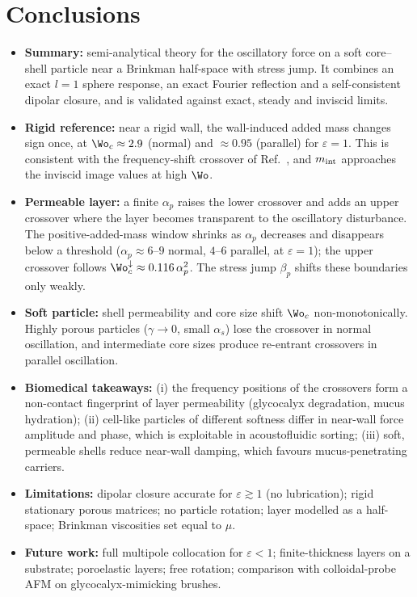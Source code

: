 \section{Conclusions}\label{sec:conclusion}
\begin{itemize}
  \item \textbf{Summary:} semi-analytical theory for the oscillatory force on a soft core--shell particle near a
        Brinkman half-space with stress jump. It combines an exact $l=1$ sphere response, an exact Fourier reflection and a
        self-consistent dipolar closure, and is validated against exact, steady and inviscid limits.
  \item \textbf{Rigid reference:} near a rigid wall, the wall-induced added mass changes sign once, at
        $\Wo_c\approx2.9$ (normal) and $\approx0.95$ (parallel) for $\varepsilon=1$. This is consistent with the
        frequency-shift crossover of Ref.~, and $m_{\rm int}$ approaches the inviscid image
        values at high $\Wo$.
  \item \textbf{Permeable layer:} a finite $\alpha_p$ raises the lower crossover and adds an upper crossover where the
        layer becomes transparent to the oscillatory disturbance. The positive-added-mass window shrinks as
        $\alpha_p$ decreases and disappears below a threshold ($\alpha_p\approx6$--$9$ normal, $4$--$6$ parallel, at $\varepsilon=1$); the upper crossover follows $\Wo_c^{\downarrow}\approx0.116\,\alpha_p^2$. The
        stress jump $\beta_p$ shifts these boundaries only weakly.
  \item \textbf{Soft particle:} shell permeability and core size shift $\Wo_c$ non-monotonically. Highly porous
        particles ($\gamma\to0$, small $\alpha_s$) lose the crossover in normal oscillation, and intermediate core
        sizes produce re-entrant crossovers in parallel oscillation.
  \item \textbf{Biomedical takeaways:} (i) the frequency positions of the crossovers form a non-contact fingerprint of
        layer permeability (glycocalyx degradation, mucus hydration); (ii) cell-like particles of different softness
        differ in near-wall force amplitude and phase, which is exploitable in acoustofluidic sorting; (iii) soft,
        permeable shells reduce near-wall damping, which favours mucus-penetrating carriers.
  \item \textbf{Limitations:} dipolar closure accurate for $\varepsilon\gtrsim1$ (no lubrication); rigid stationary
        porous matrices; no particle rotation; layer modelled as a half-space; Brinkman viscosities set equal to $\mu$.
  \item \textbf{Future work:} full multipole collocation for $\varepsilon<1$; finite-thickness layers on a substrate;
        poroelastic layers; free rotation; comparison with colloidal-probe AFM on glycocalyx-mimicking brushes.
\end{itemize}
